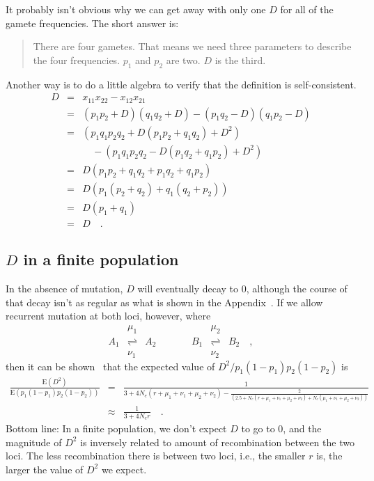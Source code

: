 It probably isn't obvious why we can get away with only one $D$ for
all of the gamete frequencies. The short answer is:
\begin{quote}There are four gametes. That means we need three
  parameters to describe the four frequencies. $p_1$ and $p_2$ are
  two. $D$ is the third.
\end{quote}
Another way is to do a little algebra to verify that the definition is
self-consistent.
\begin{eqnarray*}
D &=& x_{11}x_{22} - x_{12}x_{21} \\
  &=& (p_1p_2 + D)(q_1q_2 + D) - (p_1q_2 - D)(q_1p_2 - D) \\
  &=& \left(p_1q_1p_2q_2 + D(p_1p_2 + q_1q_2) + D^2\right) \\
  && \quad - \left(p_1q_1p_2q_2 - D(p_1q_2 + q_1p_2) + D^2\right) \\
  &=& D(p_1p_2 + q_1q_2 + p_1q_2 + q_1p_2) \\
  &=& D\left(p_1(p_2 + q_2) + q_1(q_2 + p_2)\right) \\
  &=& D(p_1 + q_1) \\
  &=& D \quad.
\end{eqnarray*}

\subsection*{$D$ in a finite population}

In the absence of mutation, $D$ will eventually decay to 0, although
the course of that decay isn't as regular as what is shown in the
Appendix~\cite{Hill-Robertson-1968}. If we allow recurrent mutation at
both loci, however, where
\[
\begin{array}{ccccccc}
    &\mu_1            &     &      &     &\mu_2 \\
A_1 &\rightleftharpoons& A_2 &\qquad& B_1 &\rightleftharpoons& B_2
\quad , \\
    &\nu_1            &     &      &     &\nu_2
\end{array}
\]
then it can be shown~\cite{Ohta-Kimura-1969} that the expected value
of $D^2/p_1(1-p_1)p_2(1-p_2)$ is
{\scriptsize
\begin{eqnarray*}
\frac{\mbox{E}(D^2)}{\mbox{E}(p_1(1-p_1)p_2(1-p_2))}
&=& \frac{1}{3 + 4N_e(r+\mu_1+\nu_1+\mu_2+\nu_2)
                           - \frac{2}{(2.5 + N_e(r+\mu_1+\nu_1+\mu_2+\nu_2)
                              + N_e(\mu_1+\nu_1+\mu_2+\nu_2))}} \\
&\approx& \frac{1}{3 + 4N_er} \quad .
\end{eqnarray*}}
Bottom line: In a finite population, we don't expect $D$ to go to 0,
and the magnitude of $D^2$ is inversely related to amount of
recombination between the two loci. The less recombination there is
between two loci, i.e., the smaller $r$ is, the larger the value of
$D^2$ we expect.

